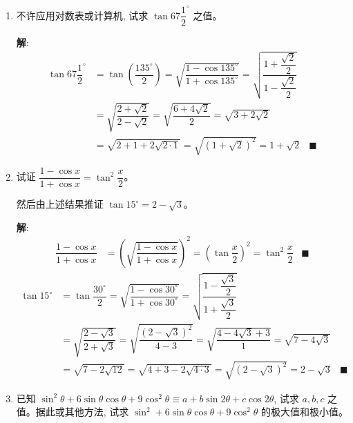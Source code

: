 \documentclass{report}
\newcommand{\sol}{\vspace{0.2cm}\textbf{解}:}
\begin{document}
\begin{enumerate}[leftmargin=*]
        \item 不许应用对数表或计算机, 试求 $\tan 67 \dfrac{1}{2}^{\circ}$ 之值。
        
        \sol{}
        \begin{align*}
            \tan 67 \dfrac{1}{2}^{\circ} &= \tan\left(\dfrac{135^{\circ}}{2}\right) = \sqrt{\dfrac{1-\cos 135^{\circ}}{1+\cos 135^{\circ}}} = \sqrt{\dfrac{1+\dfrac{\sqrt{2}}{2}}{1-\dfrac{\sqrt{2}}{2}}}\\
            &= \sqrt{\dfrac{2+\sqrt{2}}{2-\sqrt{2}}} = \sqrt{\dfrac{6+4\sqrt{2}}{2}} = \sqrt{3+2\sqrt{2}} \\
            &= \sqrt{2 + 1 + 2\sqrt{2\cdot 1}} = \sqrt{(1+\sqrt{2})^2} = 1+\sqrt{2} & \blacksquare
        \end{align*}
        
        \item 试证 $\dfrac{1-\cos x}{1+\cos x}=\tan ^2 \dfrac{x}{2}$。
        
        然后由上述结果推证 $\tan 15^{\circ}=2-\sqrt{3}$。

        \sol{}
        \begin{align*}
            \dfrac{1-\cos x}{1+\cos x} &= \left(\sqrt{\dfrac{1-\cos x}{1+\cos x}}\right)^2 = \left(\tan\dfrac{x}{2}\right)^2 = \tan^2\dfrac{x}{2} & \blacksquare
        \end{align*}
        \begin{align*}
            \tan 15^{\circ} &= \tan\dfrac{30^{\circ}}{2} = \sqrt{\dfrac{1-\cos 30^{\circ}}{1+\cos 30^{\circ}}} = \sqrt{\dfrac{1-\dfrac{\sqrt{3}}{2}}{1+\dfrac{\sqrt{3}}{2}}}\\
            &= \sqrt{\dfrac{2-\sqrt{3}}{2+\sqrt{3}}} = \sqrt{\dfrac{(2-\sqrt{3})^2}{4-3}} = \sqrt{\dfrac{4-4\sqrt{3}+3}{1}} = \sqrt{7-4\sqrt{3}}\\
            &= \sqrt{7 - 2\sqrt{12}} = \sqrt{4 + 3 - 2\sqrt{4\cdot 3}} = \sqrt{(2-\sqrt{3})^2} = 2-\sqrt{3} & \blacksquare
        \end{align*}
        
        
        \item 已知 $\sin ^2 \theta+6 \sin \theta \cos \theta+9 \cos ^2 \theta \equiv a+b \sin 2 \theta+c \cos 2 \theta$, 试求 $a, b, c$ 之值。据此或其他方法, 试求 $\sin ^2+6 \sin \theta \cos \theta+9 \cos ^2 \theta$ 的极大值和极小值。
        

\end{enumerate}
\end{document}
